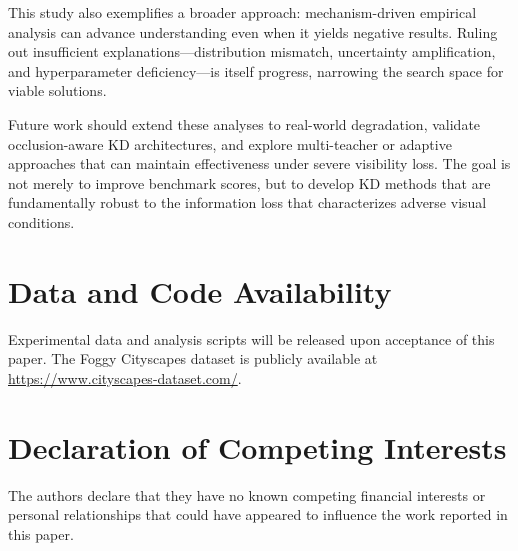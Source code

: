 This study also exemplifies a broader approach: mechanism-driven empirical analysis can advance understanding even when it yields negative results. Ruling out insufficient explanations---distribution mismatch, uncertainty amplification, and hyperparameter deficiency---is itself progress, narrowing the search space for viable solutions.

Future work should extend these analyses to real-world degradation, validate occlusion-aware KD architectures, and explore multi-teacher or adaptive approaches that can maintain effectiveness under severe visibility loss. The goal is not merely to improve benchmark scores, but to develop KD methods that are fundamentally robust to the information loss that characterizes adverse visual conditions.

\section*{Data and Code Availability}

Experimental data and analysis scripts will be released upon acceptance of this paper. The Foggy Cityscapes dataset is publicly available at \url{https://www.cityscapes-dataset.com/}.

\section*{Declaration of Competing Interests}

The authors declare that they have no known competing financial interests or personal relationships that could have appeared to influence the work reported in this paper.
